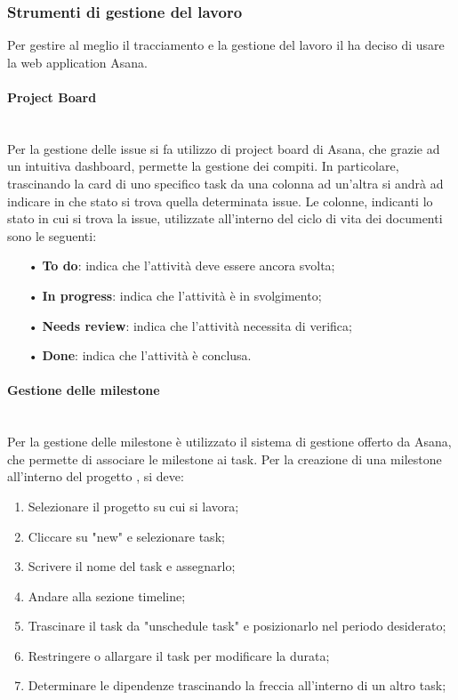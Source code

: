     \subsubsection{Strumenti di gestione del lavoro}\mbox{}
    Per gestire al meglio il tracciamento e la gestione del lavoro il \Gruppo \space ha deciso di usare la web application Asana. 

    \paragraph{Project Board}\mbox{}\\
    \label{sec:projectboard}
    Per la gestione delle {issue} si fa utilizzo di {project board} di Asana, che grazie ad un intuitiva dashboard, permette
    la gestione dei compiti. In particolare, trascinando la {card} di uno specifico task da una colonna ad un'altra si andrà ad 
    indicare in che stato si trova quella determinata issue.
    Le colonne, indicanti lo stato in cui si trova la issue, utilizzate all'interno del ciclo di vita dei 
    documenti sono le seguenti:
    \begin{itemize}
    \item[•] \textbf{To do}: indica che l'attività deve essere ancora svolta;
    \item[•] \textbf{In progress}: indica che l'attività è in svolgimento;
    \item[•] \textbf{Needs review}: indica che l'attività necessita di verifica;
    \item[•] \textbf{Done}: indica che l'attività è conclusa.
    \end{itemize}

    \paragraph{Gestione delle milestone}\mbox{}\\
    Per la gestione delle {milestone} è utilizzato il sistema di gestione offerto da Asana, che permette di associare le 
    milestone ai task.
    Per la creazione di una milestone all'interno del progetto \NomeProgetto, si deve:
    \begin{enumerate}
    \item Selezionare il progetto su cui si lavora;
    \item Cliccare su "new" e selezionare task;
    \item Scrivere il nome del task e assegnarlo;
    \item Andare alla sezione timeline;
    \item Trascinare il task da "unschedule task" e posizionarlo nel periodo desiderato;
    \item Restringere o allargare il task per modificare la durata; 
    \item Determinare le dipendenze trascinando la freccia all'interno di un altro task;
    \end{enumerate}

